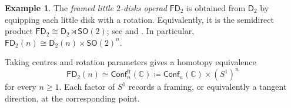 \documentclass{amsart}
\newcommand{\lrar}{\ensuremath{\longrightarrow}}
\newcommand{\Conf}{\mathsf{Conf}}%
\theoremstyle{definition}
\newtheorem{example}[theorem]{Example}%
\numberwithin{equation}{section}
\begin{document}
\begin{example}
\label{example: FD_2}
The \emph{framed little $2$-disks operad} $\mathsf{FD}_2$ is obtained
from $\mathsf{D}_2$ by equipping each little disk with a rotation.
Equivalently, it is the semidirect product
$\mathsf{FD}_2\cong\mathsf{D}_2\rtimes\mathsf{SO}(2)$; see
\cite[Example~1.3.1]{Wahl_Thesis} and
\cite{salvatore2003framed}. In particular,
$\mathsf{FD}_2(n)\cong\mathsf{D}_2(n)\times\mathsf{SO}(2)^n$.

Taking centres and rotation parameters gives a homotopy equivalence
\[
\mathsf{FD}_2(n)\simeq\Conf_n^{\mathrm{fr}}(\mathbb{C})
\coloneqq\Conf_n(\mathbb{C})\times(S^1)^n
\]
for every $n\geq1$. Each factor of $S^1$ records a framing, or equivalently a tangent direction, at the corresponding point.
\end{example}

\end{document}
